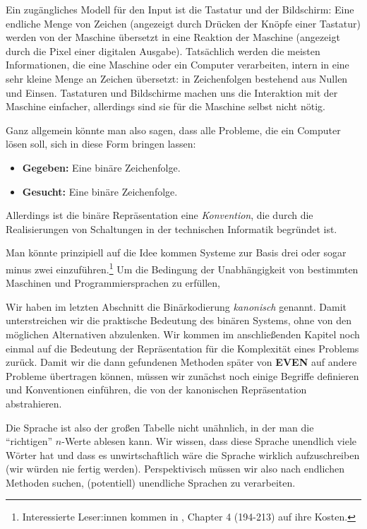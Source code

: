 Ein zugängliches Modell für den Input ist die Tastatur und der Bildschirm:
Eine endliche Menge von Zeichen (angezeigt durch Drücken der Knöpfe einer Tastatur)
werden von der Maschine übersetzt in eine Reaktion der Maschine 
(angezeigt durch die Pixel einer digitalen Ausgabe).
Tatsächlich werden die meisten Informationen,
die eine Maschine oder ein Computer verarbeiten,
intern in eine sehr kleine Menge an Zeichen übersetzt:
in Zeichenfolgen bestehend aus Nullen und Einsen.
Tastaturen und Bildschirme machen uns die Interaktion mit der Maschine einfacher,
allerdings sind sie für die Maschine selbst nicht nötig.

Ganz allgemein könnte man also sagen, dass alle Probleme, die ein Computer lösen soll,
sich in diese Form bringen lassen:
\begin{itemize}
    \item \textbf{Gegeben:} Eine binäre Zeichenfolge.
    \item \textbf{Gesucht:} Eine binäre Zeichenfolge.
\end{itemize}


Allerdings ist die binäre Repräsentation eine \emph{Konvention},
die durch die Realisierungen von Schaltungen in der technischen Informatik begründet ist.



Man könnte prinzipiell auf die Idee kommen Systeme zur Basis drei oder sogar minus zwei 
einzuführen.\footnote{
    Interessierte Leser:innen kommen in \cite{knuth2}, Chapter 4 (194-213) auf ihre Kosten.
}
Um die Bedingung der Unabhängigkeit von bestimmten Maschinen und Programmiersprachen zu erfüllen,





Wir haben im letzten Abschnitt die Binärkodierung \emph{kanonisch} genannt. 
Damit unterstreichen wir die praktische Bedeutung des binären Systems,
ohne von den möglichen Alternativen abzulenken.
Wir kommen im anschließenden Kapitel noch einmal auf die Bedeutung der Repräsentation
für die Komplexität eines Problems zurück.
Damit wir die dann gefundenen Methoden später von \textbf{EVEN}
auf andere Probleme übertragen können,
müssen wir zunächst noch einige Begriffe definieren und Konventionen einführen,
die von der kanonischen Repräsentation abstrahieren.

Die Sprache ist also der großen Tabelle nicht unähnlich,
in der man die ``richtigen'' $n$-Werte ablesen kann.
Wir wissen, dass diese Sprache unendlich viele Wörter hat und dass es unwirtschaftlich wäre
die Sprache wirklich aufzuschreiben (wir würden nie fertig werden).
Perspektivisch müssen wir also nach endlichen Methoden suchen,
(potentiell) unendliche Sprachen zu verarbeiten.

